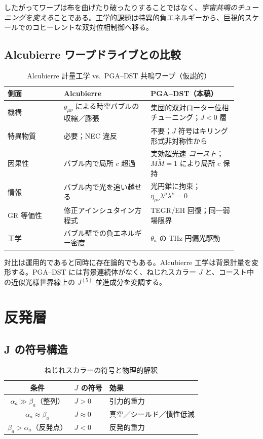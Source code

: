 \documentclass[dvipdfmx,a4paper]{article}
\theoremstyle{definition}
\begin{document}
したがってワープは布を曲げたり破ったりすることではなく、\emph{宇宙共鳴のチューニングを変える}ことである。工学的課題は特異的負エネルギーから、巨視的スケールでのコヒーレントな双対位相制御へ移る。

\subsection{Alcubierre ワープドライブとの比較}

\begin{table}[ht]
\centering
\caption{Alcubierre 計量工学 vs.\ PGA--DST 共鳴ワープ（仮説的）}
\label{tab:alcubierre}
\begin{tabular}{@{}>{\raggedright\arraybackslash}p{0.22\linewidth}>{\raggedright\arraybackslash}p{0.34\linewidth}>{\raggedright\arraybackslash}p{0.34\linewidth}@{}}
\toprule
側面 & Alcubierre~\cite{alcubierre1994} & PGA--DST（本稿） \\
\midrule
機構 &
$g_{\mu\nu}$ による時空バブルの収縮／膨張 &
集団的双対ローター位相チューニング；$J<0$ 層 \\
特異物質 &
必要；NEC 違反~\cite{ford2000} &
不要；$J$ 符号はキリング形式非対称性から \\
因果性 &
バブル内で局所 $c$ 超過 &
実効超光速 \emph{コースト}；$M\widetilde{M}=1$ により局所 $c$ 保持 \\
情報 &
バブル内で光を追い越せる &
光円錐に拘束；$\eta_{\mu\nu}\lambda^\mu\lambda^\nu=0$ \\
GR 等価性 &
修正アインシュタイン方程式 &
TEGR/EH 回復；同一弱場限界 \\
工学 &
バブル壁での負エネルギー密度 &
$\theta_a$ の THz 円偏光駆動 \\
\bottomrule
\end{tabular}
\end{table}

対比は運用的であると同時に存在論的でもある。Alcubierre 工学は背景計量を変形する。PGA--DST には背景連続体がなく、ねじれスカラー $J$ と、コースト中の近似光様世界線上の $J^{(5)}$ 並進成分を変調する。

\section{反発層}
\label{sec:repulsive}

\subsection{J の符号構造}

\begin{table}[ht]
\centering
\caption{ねじれスカラーの符号と物理的解釈}
\label{tab:J-signs}
\begin{tabular}{@{}cll@{}}
\toprule
条件 & $J$ の符号 & 効果 \\
\midrule
$\alpha_a \gg \beta_a$（整列） & $J > 0$ & 引力的重力 \\
$\alpha_a \approx \beta_a$ & $J \approx 0$ & 真空／シールド／慣性低減 \\
$\beta_a > \alpha_a$（反発点） & $J < 0$ & 反発的重力 \\
\bottomrule
\end{tabular}
\end{table}
\end{document}
